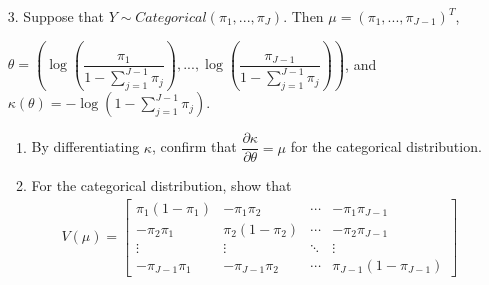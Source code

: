 \documentclass[11pt]{article}
\begin{document}
\begin{enumerate}
\item[3.] Suppose that $Y \sim Categorical(\pi_{1},...,\pi_{J})$. Then $\mu = (\pi_1,...,\pi_{J-1})^T$, 

$\theta = \left( \log \left(\dfrac{\pi_1}{1 - \sum_{j=1}^{J-1} \pi_j} \right), ..., \log \left( \dfrac{\pi_{J-1}}{1 - \sum_{j=1}^{J-1} \pi_j} \right) \right)$, and $\kappa(\theta) = -\log\left(1 - \sum \limits_{j=1}^{J-1} \pi_j \right)$.

\begin{enumerate}
\item By differentiating $\kappa$, confirm that $\dfrac{\partial \kappa}{\partial \theta} = \mu$ for the categorical distribution.

\item For the categorical distribution, show that
\begin{align*}
V(\mu) = \begin{bmatrix}
\pi_1(1 - \pi_1) & -\pi_1 \pi_2 & \cdots & - \pi_1 \pi_{J-1} \\
-\pi_2 \pi_1 & \pi_2(1 - \pi_2) & \cdots & - \pi_2 \pi_{J-1} \\
\vdots & \vdots & \ddots & \vdots \\
-\pi_{J-1} \pi_1 &  -\pi_{J-1} \pi_2 & \cdots & \pi_{J-1}(1 - \pi_{J-1})
\end{bmatrix}
\end{align*}
\end{enumerate}
\end{enumerate}
\end{document}
